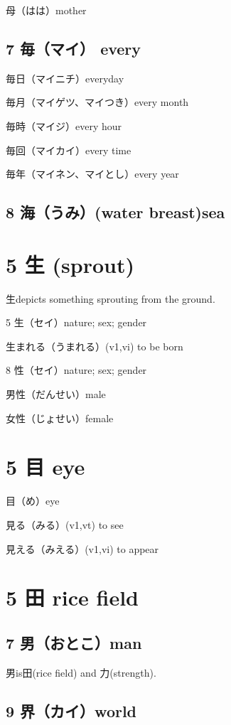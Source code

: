 母（はは）mother

\subsection{7 毎（マイ） every}

毎日（マイニチ）everyday

毎月（マイゲツ、マイつき）every month

毎時（マイジ）every hour

毎回（マイカイ）every time

毎年（マイネン、マイとし）every year

\subsection{8 海（うみ）(water breast)sea}

\section{5 生 (sprout)}

生depicts something sprouting from the ground.

5 生（セイ）nature; sex; gender

生まれる（うまれる）(v1,vi) to be born

8 性（セイ）nature; sex; gender

男性（だんせい）male

女性（じょせい）female

\section{5 目 eye}

目（め）eye

見る（みる）(v1,vt) to see

見える（みえる）(v1,vi) to appear

\section{5 田 rice field}

\subsection{7 男（おとこ）man}

男is田(rice field) and 力(strength).

\subsection{9 界（カイ）world}

